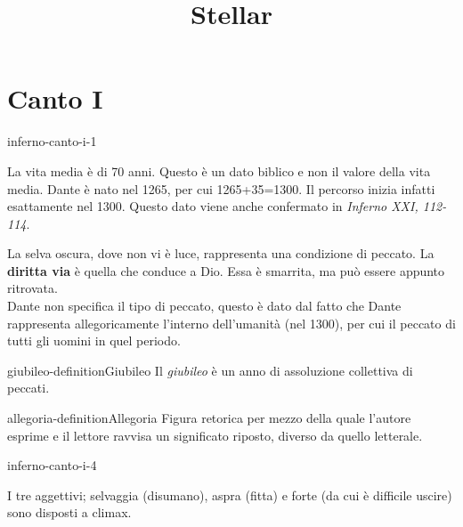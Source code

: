 \documentclass[preview]{standalone}
\begin{document}
\title{Stellar}
\genpage

\section{Canto I}


\begin{snippet}{inferno-canto-i-1}

    La vita media è di 70 anni. Questo è un dato biblico e non il valore della vita media.
    Dante è nato nel 1265, per cui 1265+35=1300. Il percorso inizia infatti esattamente nel 1300.
    Questo dato viene anche confermato in \textit{Inferno XXI, 112-114}.

    La selva oscura, dove non vi è luce, rappresenta una condizione di peccato.
    La \textbf{diritta via} è quella che conduce a Dio.
    Essa è smarrita, ma può essere appunto ritrovata.
    \\
    Dante non specifica il tipo di peccato, questo è dato dal fatto che Dante rappresenta allegoricamente
    l'interno dell'umanità (nel 1300), per cui il peccato di tutti gli uomini in quel periodo.
\end{snippet}

\begin{snippetdefinition}{giubileo-definition}{Giubileo}
    Il \textit{giubileo} è un anno di assoluzione collettiva di peccati.
\end{snippetdefinition}


\begin{snippetdefinition}{allegoria-definition}{Allegoria}
    Figura retorica per mezzo della quale l'autore esprime e il lettore ravvisa un significato riposto,
    diverso da quello letterale.
\end{snippetdefinition}

\begin{snippet}{inferno-canto-i-4}

    I tre aggettivi; selvaggia (disumano), aspra (fitta) e forte (da cui è difficile uscire)
    sono disposti a climax.
\end{snippet}
\end{document}
